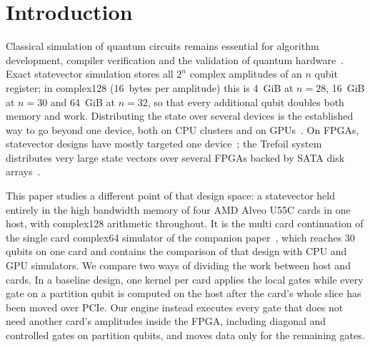 \documentclass[pdflatex,sn-mathphys-num]{sn-jnl}
\theoremstyle{thmstyleone}
\theoremstyle{thmstylethree}
\begin{document}
\section{Introduction}\label{sec:introduction}

Classical simulation of quantum circuits remains essential for algorithm development, compiler verification and
the validation of quantum hardware~\cite{preskill2018nisq,arute2019supremacy}. Exact statevector simulation stores all
$2^n$ complex amplitudes of an $n$ qubit register; in complex128 (16~bytes per amplitude) this is 4~GiB at $n=28$, 16~GiB
at $n=30$ and 64~GiB at $n=32$, so that every additional qubit doubles both memory and work. Distributing the state
over several devices is the established way to go beyond one device, both on CPU clusters and on
GPUs~\cite{smelyanskiy2016qhipster,jones2019quest,haner2017petabyte,deraedt2019massively,imamura2022mpiqulacs,bayraktar2023cuquantum}.
On FPGAs, statevector designs have mostly targeted one device~\cite{khalid2004fpga,lee2016fpga,pilch2019fpga,mahmud2019scaling,pcq2024,tiwari2026fpga30};
the Trefoil system distributes very large state vectors over several FPGAs backed by SATA disk arrays~\cite{niwase2023trefoil,wei2025qutrefoil}.

This paper studies a different point of that design space: a statevector held entirely in the high bandwidth memory
of four AMD Alveo U55C cards in one host, with complex128 arithmetic throughout. It is the multi card continuation of
the single card complex64 simulator of the companion paper~\cite{tiwari2026fpga30}, which reaches 30 qubits on one card
and contains the comparison of that design with CPU and GPU simulators. We compare two ways of dividing the work
between host and cards. In a baseline design, one kernel per card applies the local gates while every gate on a
partition qubit is computed on the host after the card's whole slice has been moved over PCIe. Our engine instead
executes every gate that does not need another card's amplitudes inside the FPGA, including diagonal and controlled
gates on partition qubits, and moves data only for the remaining gates.
\end{document}
